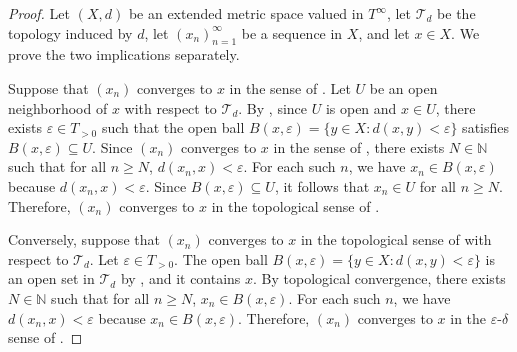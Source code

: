 \begin{proof}
    Let $(X,d)$ be an extended metric space valued in $T^\infty$, let $\mathcal{T}_d$ be the topology induced by $d$, let $(x_n)_{n=1}^\infty$ be a sequence in $X$, and let $x \in X$. We prove the two implications separately.

    Suppose that $(x_n)$ converges to $x$ in the sense of . Let $U$ be an open neighborhood of $x$ with respect to $\mathcal{T}_d$. By , since $U$ is open and $x \in U$, there exists $\varepsilon \in T_{>0}$ such that the open ball $B(x,\varepsilon) = \{y \in X : d(x,y) < \varepsilon\}$ satisfies $B(x,\varepsilon) \subseteq U$. Since $(x_n)$ converges to $x$ in the sense of , there exists $N \in \mathbb{N}$ such that for all $n \geq N$, $d(x_n, x) < \varepsilon$. For each such $n$, we have $x_n \in B(x,\varepsilon)$ because $d(x_n,x) < \varepsilon$. Since $B(x,\varepsilon) \subseteq U$, it follows that $x_n \in U$ for all $n \geq N$. Therefore, $(x_n)$ converges to $x$ in the topological sense of .

    Conversely, suppose that $(x_n)$ converges to $x$ in the topological sense of  with respect to $\mathcal{T}_d$. Let $\varepsilon \in T_{>0}$. The open ball $B(x,\varepsilon) = \{y \in X : d(x,y) < \varepsilon\}$ is an open set in $\mathcal{T}_d$ by , and it contains $x$. By topological convergence, there exists $N \in \mathbb{N}$ such that for all $n \geq N$, $x_n \in B(x,\varepsilon)$. For each such $n$, we have $d(x_n, x) < \varepsilon$ because $x_n \in B(x,\varepsilon)$. Therefore, $(x_n)$ converges to $x$ in the $\varepsilon$-$\delta$ sense of .
\end{proof}
